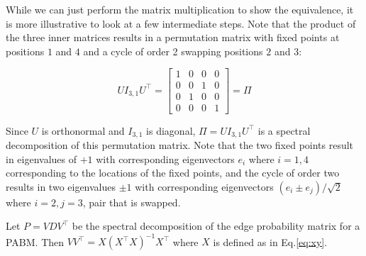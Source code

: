 \documentclass[12pt]{article}
\begin{document}
\begin{remark} 
While we can just perform the matrix multiplication to show the 
equivalence, it is more illustrative to look at a few intermediate steps. Note 
that the product of the three inner matrices results in a permutation matrix 
with fixed points at positions $1$ and $4$ and a cycle of order 2 swapping 
positions $2$ and $3$: 

$$U I_{3, 1} U^\top = \begin{bmatrix} 
  1 & 0 & 0 & 0 \\ 
  0 & 0 & 1 & 0 \\ 
  0 & 1 & 0 & 0 \\ 
  0 & 0 & 0 & 1 
\end{bmatrix} = \Pi$$

Since $U$ is orthonormal and $I_{3, 1}$ is diagonal, $\Pi = U I_{3, 1} U^\top$ 
is a spectral decomposition of this permutation matrix. Note that the two fixed 
points result in eigenvalues of $+1$ with corresponding eigenvectors $e_i$ 
where $i = 1, 4$ corresponding to the locations of the fixed points, and the 
cycle of order two results in two eigenvalues $\pm 1$ with corresponding 
eigenvectors $(e_i \pm e_j) / \sqrt{2}$ where $i = 2, j = 3$, pair that is 
swapped.
\end{remark}

\begin{lemma}
\label{lemma1}
Let $P = V D V^\top$ be the spectral decomposition of the edge probability 
matrix for a PABM. Then $V V^\top = X (X^\top X)^{-1} X^\top$ where $X$ is 
defined as in Eq.\eqref{eq:xy}.
\end{lemma}
\end{document}
